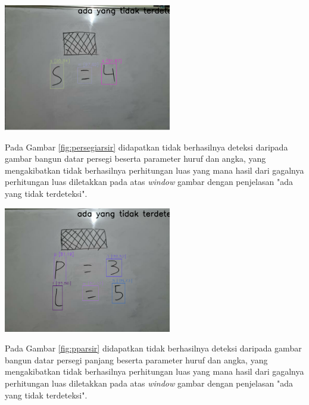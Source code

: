 \begin{center}
	\includegraphics[width=0.55\textwidth]{gambar/persegi arsir.png}
	\label{fig:persegiarsir}
\end{center}
Pada Gambar \ref{fig:persegiarsir} didapatkan tidak berhasilnya deteksi daripada gambar bangun datar persegi beserta parameter huruf dan angka, yang mengakibatkan tidak berhasilnya perhitungan luas yang mana hasil dari gagalnya perhitungan luas diletakkan pada atas \textit{window} gambar dengan penjelasan "ada yang tidak terdeteksi".

\begin{center}
	\includegraphics[width=0.55\textwidth]{gambar/persegipanjang arsir.png}
	\label{fig:pparsir}
\end{center}
Pada Gambar \ref{fig:pparsir} didapatkan tidak berhasilnya deteksi daripada gambar bangun datar persegi panjang beserta parameter huruf dan angka, yang mengakibatkan tidak berhasilnya perhitungan luas yang mana hasil dari gagalnya perhitungan luas diletakkan pada atas \textit{window} gambar dengan penjelasan "ada yang tidak terdeteksi".

